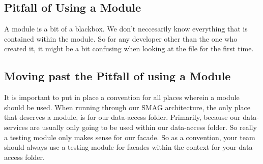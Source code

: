 \subsection{Pitfall of Using a Module}
A module is a bit of a blackbox. We don't neccesarily know everything that is
contained within the module. So for any developer other than the one who
created it, it might be a bit confusing when looking at the file for the first
time.

\subsection{Moving past the Pitfall of using a Module}
It is important to put in place a convention for all places wherein a module
should be used. When running through our SMAG architecture, the only place that
deserves a module, is for our data-access folder. Primarily, because our
data-services are usually only going to be used within our data-access folder.
So really a testing module only makes sense for our facade. So as a convention,
your team should always use a testing module for facades within the context for
your data-access folder.
